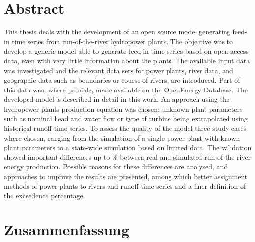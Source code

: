 \chapter*{Abstract}
\label{chap:abstract}

This thesis deals with the development of an open source model generating feed-in time series from run-of-the-river hydropower plants. The objective was to develop a generic model able to generate feed-in time series based on open-access data, even with very little information about the plants. The available input data was investigated and the relevant data sets for power plants, river data, and geographic data such as boundaries or course of rivers, are introduced. Part of this data was, where possible, made available on the OpenEnergy Database. The developed model is described in detail in this work. An approach using the hydropower plants production equation was chosen; unknown plant parameters such as nominal head and water flow or type of turbine being extrapolated using historical runoff time series. To assess the quality of the model three study cases where chosen, ranging from the simulation of a single power plant with known plant parameters to a state-wide simulation based on limited data. The validation showed important differences up to \unit[50]{\%} between real and simulated run-of-the-river energy production. Possible reasons for these differences are analysed, and approaches to improve the results are presented, among which better assignment methods of power plants to rivers and runoff time series and a finer definition of the exceedence percentage.


\chapter*{Zusammenfassung}

